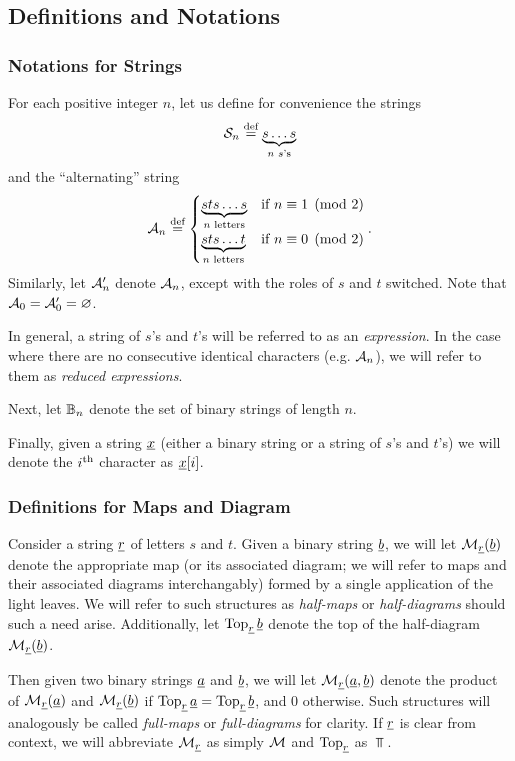 \subsection{Definitions and Notations}
\subsubsection{Notations for Strings}
For each positive integer $n$, let us define for convenience the strings
\[ \SS_n \defeq \underbrace{s \dots s}_{\text{$n$ $s$'s}} \] 
and the ``alternating'' string
\[
	\AA_n \defeq
	\begin{cases}
		\underbrace{sts\dots s}_{\text{$n$ letters}} & \text{if } n \equiv 1 \pmod{2} \\
		\underbrace{sts\dots t}_{\text{$n$ letters}} & \text{if } n \equiv 0 \pmod{2} \\
	\end{cases}.
\]
Similarly, let $\AA_n'$ denote $\AA_n$, except with the roles of $s$ and $t$ switched.  Note that $\AA_0 = \AA_0' = \varnothing$.

In general, a string of $s$'s and $t$'s will be referred to as an \emph{expression}.  In the case where there are no consecutive identical characters (e.g. $\AA_n$), we will refer to them as \emph{reduced expressions}.

Next, let $\BB_n$ denote the set of binary strings of length $n$.

Finally, given a string $\ul x$ (either a binary string or a string of $s$'s and $t$'s) we will denote the $i\th$ character as $\ul x[i]$.

\subsubsection{Definitions for Maps and Diagram}
Consider a string $\ul r$ of letters $s$ and $t$.  Given a binary string $\ul b$, we will let $\MM_{\ul r}(\ul b)$ denote the appropriate map (or its associated diagram;
we will refer to maps and their associated diagrams interchangably) formed by a single application of the light leaves.  We will refer to such structures as \emph{half-maps} or \emph{half-diagrams} should such a need arise.  Additionally, let $\Top_{\ul r} \ul b$ denote the top of the half-diagram $\MM_{\ul r}(\ul b)$.

Then given two binary strings $\ul a$ and $\ul b$, we will let $\MM_{\ul r}(\ul a, \ul b)$ denote the product of $\MM_{\ul r}(\ul a)$ and $\MM_{\ul r}(\ul b)$ if $\Top_{\ul r} \ul a = \Top_{\ul r} \ul b$, and $0$ otherwise.  
Such structures will analogously be called \emph{full-maps} or \emph{full-diagrams} for clarity.  If $\ul r$ is clear from context, we will abbreviate $\MM_{\ul r}$ as simply $\MM$ and $\Top_{\ul r}$ as $\Top$.

